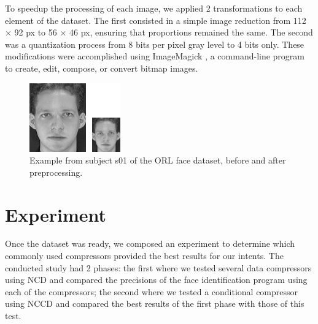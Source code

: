 \documentclass[12pt]{article}
\begin{document}
To speedup the processing of each image, we applied 2 transformations to each element of the dataset.
The first consisted in a simple image reduction from 112 $\times$ 92 px to 56 $\times$ 46 px, ensuring that proportions remained the same.
The second was a quantization process from 8 bits per pixel gray level to 4 bits only.
These modifications were accomplished using ImageMagick \cite{imgmagick}, a command-line program to create, edit, compose, or convert bitmap images.

\begin{figure}[H]
  \centering
  \begin{minipage}{.2\textwidth}
    \centering
    \includegraphics[width=\linewidth]{preprocessing_example.png}
  \end{minipage}%
  \caption{Example from subject s01 of the ORL face dataset, before and after preprocessing.}
  \label{fig:2}
\end{figure}

\newpage
\section{Experiment} %

Once the dataset was ready, we composed an experiment to determine which commonly used compressors provided the best results for our intents.
The conducted study had 2 phases: the first where we tested several data compressors using NCD and compared the precisions of the face identification 
program using each of the compressors; the second where we tested a conditional compressor using NCCD and compared the best results of the first phase with 
those of this test.
\end{document}
